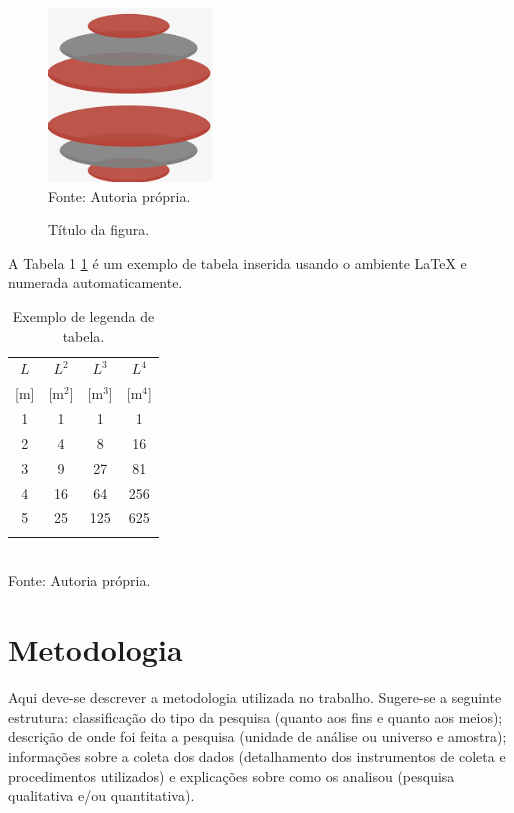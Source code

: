 \documentclass[
article,			%
11pt,				%
twoside,			%
a4paper,			%
section=TITLE,		%
onecolumn,          %
english,			%
brazil,				%
sumario=tradicional
]{abntex2}
\begin{document}
\begin{figure}[!htb]
\centering%
\caption{Título da figura.}%
\label{fig1}
\includegraphics[width = 0.5\columnwidth]{figuras/Imagem1.png}
\\Fonte: Autoria própria.
\end{figure}

A Tabela 1 \ref{tab:Ldimens} é um exemplo de tabela inserida usando o ambiente LaTeX e numerada automaticamente.

\begin{table}[!htb]
\centering%
\small%
\caption{Exemplo de legenda de tabela.}%
\label{tab:Ldimens}
\begin{tabular*}{\columnwidth}{@{\extracolsep{\fill}}cccc}
\toprule
$L$   & $L^2$     & $L^3$     & $L^4$     \\
{[m]} & {[m$^2$]} & {[m$^3$]} & {[m$^4$]} \\
\midrule
1     & 1         & 1         & 1         \\
2     & 4         & 8         & 16        \\
3     & 9         & 27        & 81        \\
4     & 16        & 64        & 256       \\
5     & 25        & 125       & 625       \\
\bottomrule
\addlinespace
\end{tabular*}
\\Fonte: Autoria própria.
\end{table}

    
\section{Metodologia}
    
Aqui deve-se descrever a metodologia utilizada no trabalho. Sugere-se a seguinte estrutura: classificação do tipo da pesquisa (quanto aos fins e quanto aos meios); descrição de onde foi feita a pesquisa (unidade de análise ou universo e amostra); informações sobre a coleta dos dados (detalhamento dos instrumentos de coleta e procedimentos utilizados) e explicações sobre como os analisou (pesquisa qualitativa e/ou quantitativa).
\end{document}
